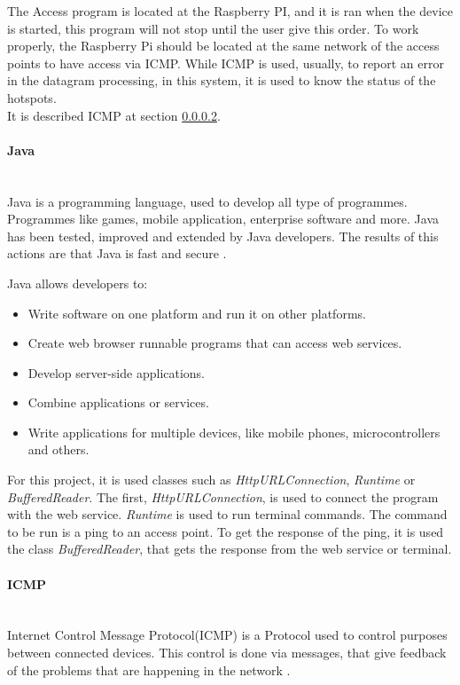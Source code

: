 \documentclass[12pt, a4paper,twoside]{tesi_upf}
\begin{document}
The Access program is located at the Raspberry PI, and it is ran when the device is started, this program will not stop until the user give this order. To work properly, the Raspberry Pi should be located at the same network of the access points to have access via ICMP. While ICMP is used, usually, to report an error in the datagram processing, in this system, it is used to know the status of the hotspots.\\

            It is described ICMP at section \ref{icmp}.

            \paragraph{Java}
            \label{java}\\
            Java is a programming language, used to develop all type of programmes. Programmes like games, mobile application, enterprise software and more. 
            Java has been tested, improved and extended by Java developers. The results of this actions are that Java is fast and secure \cite{Java}. 
            
            Java allows developers to:
            \begin{itemize}
            \item Write software on one platform and run it on other platforms.
            \item Create web browser runnable programs that can  access web services.
            \item Develop server-side applications.
            \item Combine applications or services.
            \item Write applications for multiple devices, like mobile phones, microcontrollers and others.
\end{itemize}
            
           For this project, it is used classes such as \emph{HttpURLConnection}, \emph{Runtime} or \emph{BufferedReader}. The first, \emph{HttpURLConnection}, is used to connect the program with the web service. \emph{Runtime} is used to run terminal commands. The command to be run is a ping to an access point. To get the response of the ping, it is used the class \emph{BufferedReader}, that gets the response from the web service or terminal. 
             
            
            \paragraph{ICMP}
            \label{icmp}\\
            Internet Control Message Protocol(ICMP) is a Protocol used to control purposes between connected devices. This control is done via messages, that give feedback of the problems that are happening in the network \cite{icmp}.\\
            
\end{document}
